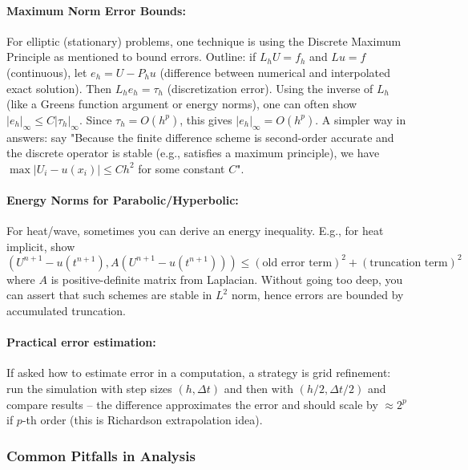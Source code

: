 \documentclass[a4paper,11pt]{article}
\begin{document}
\paragraph{Maximum Norm Error Bounds:} For elliptic (stationary) problems, one technique is using the Discrete Maximum Principle as mentioned to bound errors. Outline: if $L_h U = f_h$ and $L u = f$ (continuous), let $e_h = U - P_h u$ (difference between numerical and interpolated exact solution). Then $L_h e_h = \tau_h$ (discretization error). Using the inverse of $L_h$ (like a Greens function argument or energy norms), one can often show $|e_h|_\infty \le C |\tau_h|_\infty$. Since $\tau_h = O(h^p)$, this gives $|e_h|_\infty = O(h^p)$. A simpler way in answers: say "Because the finite difference scheme is second-order accurate and the discrete operator is stable (e.g., satisfies a maximum principle), we have $\max|U_i - u(x_i)| \le C h^2$ for some constant $C$".

\paragraph{Energy Norms for Parabolic/Hyperbolic:} For heat/wave, sometimes you can derive an energy inequality. E.g., for heat implicit, show $(U^{n+1} - u(t^{n+1}), A (U^{n+1}-u(t^{n+1}))) \le (\text{old error term})^2 + (\text{truncation term})^2$ where $A$ is positive-definite matrix from Laplacian. Without going too deep, you can assert that such schemes are stable in $L^2$ norm, hence errors are bounded by accumulated truncation.

\paragraph{Practical error estimation:} If asked how to estimate error in a computation, a strategy is grid refinement: run the simulation with step sizes $(h, \Delta t)$ and then with $(h/2, \Delta t/2)$ and compare results -- the difference approximates the error and should scale by $\approx 2^p$ if $p$-th order (this is Richardson extrapolation idea).

\subsubsection{Common Pitfalls in Analysis}
\end{document}
